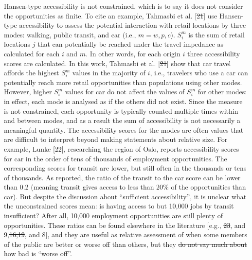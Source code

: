 \documentclass[10pt,letterpaper]{article}
\providecommand{\DIFaddtex}[1]{{\protect\color{blue}\uwave{#1}}} %
\providecommand{\DIFdeltex}[1]{{\protect\color{red}\sout{#1}}}                      %
\providecommand{\DIFaddbegin}{} %
\providecommand{\DIFaddend}{} %
\providecommand{\DIFdelbegin}{} %
\providecommand{\DIFdelend}{} %
\providecommand{\DIFadd}[1]{\texorpdfstring{\DIFaddtex{#1}}{#1}} %
\providecommand{\DIFdel}[1]{\texorpdfstring{\DIFdeltex{#1}}{}} %
\newcommand{\DIFscaledelfig}{0.5}
\newlength{\DIFdelgraphicswidth} %
\newlength{\DIFdelgraphicsheight} %
\newcommand{\DIFaddincludegraphics}[2][]{{\color{blue}\fbox{\DIFOincludegraphics[#1]{#2}}}} %
\newcommand{\DIFdelincludegraphics}[2][]{%
\sbox{\DIFdelgraphicsbox}{\DIFOincludegraphics[#1]{#2}}%
\settoboxwidth{\DIFdelgraphicswidth}{\DIFdelgraphicsbox} %
\settoboxtotalheight{\DIFdelgraphicsheight}{\DIFdelgraphicsbox} %
\scalebox{\DIFscaledelfig}{%
\parbox[b]{\DIFdelgraphicswidth}{\usebox{\DIFdelgraphicsbox}\\[-\baselineskip] \rule{\DIFdelgraphicswidth}{0em}}\llap{\resizebox{\DIFdelgraphicswidth}{\DIFdelgraphicsheight}{%
\setlength{\unitlength}{\DIFdelgraphicswidth}%
\begin{picture}(1,1)%
\thicklines\linethickness{2pt} %
{\color[rgb]{1,0,0}\put(0,0){\framebox(1,1){}}}%
{\color[rgb]{1,0,0}\put(0,0){\line( 1,1){1}}}%
{\color[rgb]{1,0,0}\put(0,1){\line(1,-1){1}}}%
\end{picture}%
}\hspace*{3pt}}} %
} %
\DeclareRobustCommand{\DIFaddbegin}{\DIFOaddbegin \let\includegraphics\DIFaddincludegraphics} %
\DeclareRobustCommand{\DIFaddend}{\DIFOaddend \let\includegraphics\DIFOincludegraphics} %
\DeclareRobustCommand{\DIFdelbegin}{\DIFOdelbegin \let\includegraphics\DIFdelincludegraphics} %
\DeclareRobustCommand{\DIFdelend}{\DIFOaddend \let\includegraphics\DIFOincludegraphics} %
\begin{document}
Hansen-type accessibility is not constrained, which is to say it does
not consider the opportunities as finite. To cite an example, Tahmasbi
et al. {[}\DIFdelbegin \DIFdel{21}\DIFdelend \DIFaddbegin \DIFadd{34}\DIFaddend {]} use Hansen-type accessibility to assess the potential
interaction with retail locations by three modes: walking, public
transit, and car (i.e., \(m = w, p, c\)). \(S_i^m\) is the sum of retail
locations \(j\) that can potentially be reached under the travel
impedance as calculated for each \(i\) and \(m\). In other words, for
each origin \(i\) three accessibility scores are calculated. In this
work, Tahmasbi et al. {[}\DIFdelbegin \DIFdel{21}\DIFdelend \DIFaddbegin \DIFadd{34}\DIFaddend {]} show that car travel affords the highest
\(S_i^{m}\) values in the majority of \(i\), i.e., travelers who use a
car can potentially reach more retail opportunities than populations
using other modes. However, higher \(S_i^{m}\) values for car do not
affect the values of \(S_i^{m}\) for other modes: in effect, each mode
is analysed as if the others did not exist. Since the measure is not
constrained, each opportunity is typically counted multiple times within
and between modes, and as a result the sum of accessibility is not
necessarily a meaningful quantity. The accessibility scores for the
modes are often values that are difficult to interpret beyond making
statements about relative size. For example, Lunke {[}\DIFdelbegin \DIFdel{22}\DIFdelend \DIFaddbegin \DIFadd{35}\DIFaddend {]}, researching
the region of Oslo, reports accessibility scores for car in the order of
tens of thousands of employment opportunities. The corresponding scores
for transit are lower, but still often in the thousands or tens of
thousands. As reported, the ratio of the transit to the car score can be
lower than 0.2 (meaning transit gives access to less than 20\% of the
opportunities than car). But despite the discussion about ``sufficient
accessibility'', it is unclear what the unconstrained scores mean: is
having access to but 10,000 jobs by transit insufficient? After all,
10,000 employment opportunities are still plenty of opportunities. These
ratios can be found elsewhere in the literature {[}e.g., \DIFdelbegin \DIFdel{23}\DIFdelend \DIFaddbegin \DIFadd{36}\DIFaddend , and
9,\DIFdelbegin \DIFdel{16,19}\DIFdelend \DIFaddbegin \DIFadd{29,32}\DIFaddend , and 8{]}, and they are useful as relative assessment of when
some members of the public are better or worse off than others, but they
\DIFdelbegin \DIFdel{do not say much about }\DIFdelend \DIFaddbegin \DIFadd{are silent on }\DIFaddend how bad is ``worse off''.
\end{document}
